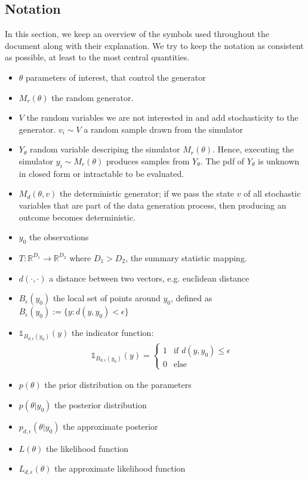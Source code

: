 \documentclass[11pt,twoside]{article}
\numberwithin{Theorem}{section}
\numberwithin{Definition}{section}
\numberwithin{Lemma}{section}
\numberwithin{Algorithm}{section}
\numberwithin{equation}{section}
\begin{document}
\subsection{Notation}

In this section, we keep an overview of the symbols used throughout the document along with their explanation. We try to keep the notation as consistent as possible, at least to the most central quantities.

\begin{itemize}
\item $\theta$ parameters of interest, that control the generator
\item $M_r(\theta)$ the random generator.
\item $V$ the random variables we are not interested in and add stochasticity to the generator. $v_i \sim V$ a random sample drawn from the simulator 
\item $Y_\theta$ random variable descriping the simulator $M_r(\theta)$. Hence, executing the simulator $y_i \sim M_r(\theta)$ produces samples from $Y_\theta$. The pdf of $Y_\theta$ is unknown in closed form or intractable to be evaluated.
\item $M_d(\theta, v)$ the deterministic generator; if we pass the state $v$ of all stochastic variables that are part of the data generation process, then producing an outcome becomes deterministic.
\item $y_0$ the observations
\item $T: \mathbb{R}^{D_1} \rightarrow \mathbb{R}^{D_2}$ where $D_1 > D_2$, the summary statistic mapping.
  \item $d(\cdot, \cdot)$ a distance between two vectors, e.g. euclidean distance
  \item $B_\epsilon(y_0)$ the local set of points around $y_0$, defined as $B_\epsilon(y_0) := \{y: d(y, y_0) < \epsilon \}$
  \item $\mathbb{1}_{B_{d,\epsilon}(y_0)}(y)$ the indicator function:
    \begin{gather*}\mathbb{1}_{B_{d,\epsilon}(y_0)}(y) = \left\{
	\begin{array}{ll}
		1 & \mbox{if } d(y,y_0) \leq \epsilon \\
		0 & \mbox{else } 
	\end{array} \right. \end{gather*}
  \item $p(\theta)$ the prior distribution on the parameters
  \item $p(\theta|y_0)$ the posterior distribution
  \item $p_{d,\epsilon}(\theta|y_0)$ the approximate posterior
  \item $L(\theta)$ the likelihood function
   \item $L_{d,\epsilon}(\theta)$ the approximate likelihood function
  \end{itemize}
\end{document}
